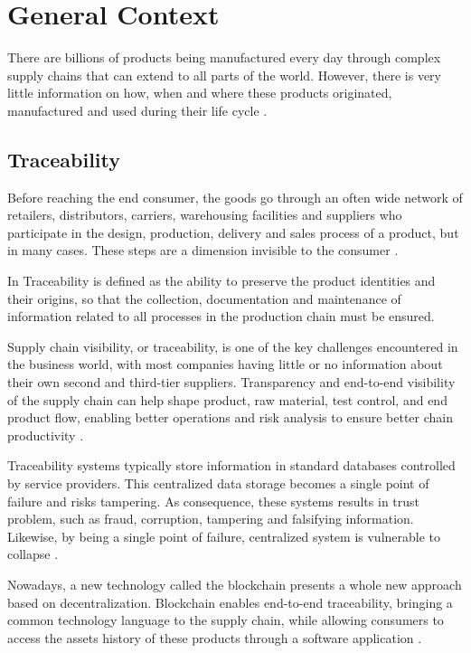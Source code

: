\section{General Context} \label{sec:General}

There are billions of products being manufactured every day through complex supply chains that can extend to all parts of the world. However, there is very little information on how, when and where these products originated, manufactured and used during their life cycle \cite{galvez2018future}.

\subsection{Traceability}\label{sec:traceability}

Before reaching the end consumer, the goods go through an often wide network of retailers, distributors, carriers, warehousing facilities and suppliers who participate in the design, production, delivery and sales process of a product, but in many cases. These steps are a dimension invisible to the consumer \cite{provenance2015}.

In \cite{gryna1998juran, Opara2001} Traceability is defined as the ability to preserve the product identities and their origins, so that the collection, documentation and maintenance of information related to all processes in the production chain must be ensured.

Supply chain visibility, or traceability, is one of the key challenges encountered in the business world, with most companies having little or no information about their own second and third-tier suppliers. Transparency and end-to-end visibility of the supply chain can help shape product, raw material, test control, and end product flow, enabling better operations and risk analysis to ensure better chain productivity \cite{abeyratne2016blockchain}.

Traceability systems typically store information in standard databases controlled by service providers. This centralized data storage becomes a single point of failure and risks tampering. As consequence, these systems results in trust problem, such as fraud, corruption, tampering and falsifying information. Likewise, by being a single point of failure, centralized system is vulnerable to collapse \cite{tian2017supply}.

Nowadays, a new technology called the blockchain presents a whole new approach based on decentralization. Blockchain enables end-to-end traceability, bringing a common technology language to the supply chain, while allowing consumers to access the assets history of these products through a software application \cite{galvez2018future}.


